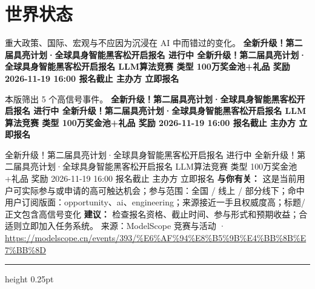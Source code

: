 \documentclass[10.5pt]{ctexart}
\begin{document}
\section*{世界状态}
{\color{ormuted} 重大政策、国际、宏观与不应因为沉浸在 AI 中而错过的变化。}
\vspace{2mm}
{\LARGE\bfseries 全新升级！第二届具亮计划·全球具身智能黑客松开启报名 进行中 全新升级！第二届具亮计划·全球具身智能黑客松开启报名 LLM算法竞赛 类型 100万奖金池+礼品 奖励 2026-11-19 16:00 报名截止 主办方 立即报名}\par
\vspace{1mm}
{\color{ormuted} 本版筛出 5 个高信号事件。}
\vspace{3mm}
{\Large\bfseries 全新升级！第二届具亮计划·全球具身智能黑客松开启报名 进行中 全新升级！第二届具亮计划·全球具身智能黑客松开启报名 LLM算法竞赛 类型 100万奖金池+礼品 奖励 2026-11-19 16:00 报名截止 主办方 立即报名}\par
全新升级！第二届具亮计划·全球具身智能黑客松开启报名 进行中 全新升级！第二届具亮计划·全球具身智能黑客松开启报名 LLM算法竞赛 类型 100万奖金池+礼品 奖励 2026-11-19 16:00 报名截止 主办方 立即报名
\textbf{与你有关：} 这是当前用户可实际参与或申请的高可触达机会；参与范围：全国 / 线上 / 部分线下；命中用户订阅版面：opportunity、ai、engineering；来源接近一手且权威度高；标题/正文包含高信号变化
\textbf{建议：} 检查报名资格、截止时间、参与形式和预期收益；合适则立即加入任务系统。
{\footnotesize\color{ormuted} 来源：ModelScope 竞赛与活动 · \url{https://modelscope.cn/events/393/%E6%AF%94%E8%B5%9B%E4%BB%8B%E7%BB%8D}}
\vspace{4mm}
\hrule height 0.25pt
\vspace{3mm}
\end{document}
